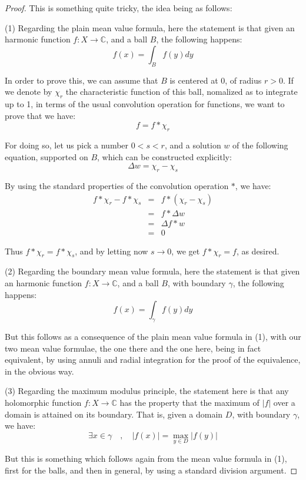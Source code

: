 \documentclass[12pt]{amsbook}
\begin{document}
\begin{proof}
This is something quite tricky, the idea being as follows:

\medskip

(1) Regarding the plain mean value formula, here the statement is that given an harmonic function $f:X\to\mathbb C$, and a ball $B$, the following happens:
$$f(x)=\int_Bf(y)dy$$

In order to prove this, we can assume that $B$ is centered at $0$, of radius $r>0$. If we denote by $\chi_r$ the characteristic function of this ball, nomalized as to integrate up to 1, in terms of the usual convolution operation for functions, we want to prove that we have:
$$f=f*\chi_r$$

For doing so, let us pick a number $0<s<r$, and a solution $w$ of the following equation, supported on $B$, which can be constructed explicitly:
$$\Delta w=\chi_r-\chi_s$$

By using the standard properties of the convolution operation $*$, we have:
\begin{eqnarray*}
f*\chi_r-f*\chi_s
&=&f*(\chi_r-\chi_s)\\
&=&f*\Delta w\\
&=&\Delta f*w\\
&=&0
\end{eqnarray*}

Thus $f*\chi_r=f*\chi_s$, and by letting now $s\to0$, we get $f*\chi_r=f$, as desired.

\medskip

(2) Regarding the boundary mean value formula, here the statement is that given an harmonic function $f:X\to\mathbb C$, and a ball $B$, with boundary $\gamma$, the following happens:
$$f(x)=\int_\gamma f(y)dy$$

But this follows as a consequence of the plain mean value formula in (1), with our two mean value formulae, the one there and the one here, being in fact equivalent, by using annuli and radial integration for the proof of the equivalence, in the obvious way. 

\medskip

(3) Regarding the maximum modulus principle, the statement here is that any holomorphic function $f:X\to\mathbb C$ has the property that the maximum of $|f|$ over a domain is attained on its boundary. That is, given a domain $D$, with boundary $\gamma$, we have:
$$\exists x\in\gamma\quad,\quad |f(x)|=\max_{y\in D}|f(y)|$$

But this is something which follows again from the mean value formula in (1), first for the balls, and then in general, by using a standard division argument.


\end{proof}
\end{document}
